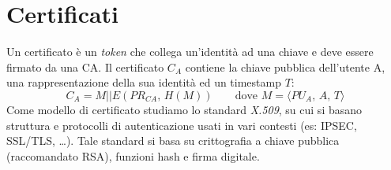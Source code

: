 \documentclass[a4paper, 11pt, twoside, openright, fleqn]{report}
\begin{document}
\section{Certificati}
Un certificato è un \emph{token} che collega un'identità ad una chiave e deve essere firmato da una CA. Il certificato $C_A$ contiene la chiave pubblica dell'utente A, una rappresentazione della sua identità ed un timestamp $T$:
\begin{equation*}
	C_A = M || E(PR_{CA},\,H(M))\qquad \mbox{dove } M=\langle PU_A,\,A,\,T\rangle
\end{equation*}
Come modello di certificato studiamo lo standard \emph{X.509}, su cui si basano struttura e protocolli di autenticazione usati in vari contesti (es: IPSEC, SSL/TLS, \dots). Tale standard si basa su crittografia a chiave pubblica (raccomandato RSA), funzioni hash e firma digitale.
\end{document}
